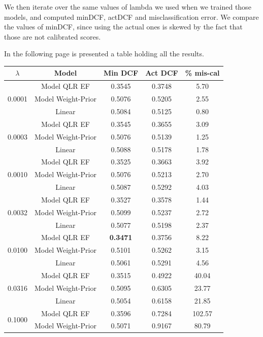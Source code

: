 \documentclass[12pt, a4paper]{article}
\begin{document}
We then iterate over the same values of lambda we used when we trained those models, and computed minDCF, actDCF and misclassification error. We compare the values of minDCF, since using the actual ones is skewed by the fact that those are not calibrated scores.

In the following page is presented a table holding all the results.
\clearpage

\begin{table}[h]
\centering
\begin{tabular}{|| c  c  c  c  c ||}
\hline
\textbf{$\lambda$} & Model & Min DCF & Act DCF & \% mis-cal \\
\hline\hline
\multirow{3}{*}{0.0001} 
 & Model QLR EF & 0.3545 & 0.3748 & 5.70 \\
 & Model Weight-Prior & 0.5076 & 0.5205 & 2.55 \\
 & Linear & 0.5084 & 0.5125 & 0.80 \\
\hline
\multirow{3}{*}{0.0003}
 & Model QLR EF & 0.3545 & 0.3655 & 3.09 \\
 & Model Weight-Prior & 0.5076 & 0.5139 & 1.25 \\
 & Linear & 0.5088 & 0.5178 & 1.78 \\
\hline
\multirow{3}{*}{0.0010}
 & Model QLR EF & 0.3525 & 0.3663 & 3.92 \\
 & Model Weight-Prior & 0.5076 & 0.5213 & 2.70 \\
 & Linear & 0.5087 & 0.5292 & 4.03 \\
\hline
\multirow{3}{*}{0.0032}
 & Model QLR EF & 0.3527 & 0.3578 & 1.44 \\
 & Model Weight-Prior & 0.5099 & 0.5237 & 2.72 \\
 & Linear & 0.5077 & 0.5198 & 2.37 \\
\hline
\multirow{3}{*}{0.0100}
 & Model QLR EF & \textbf{0.3471} & 0.3756 & 8.22 \\
 & Model Weight-Prior & 0.5101 & 0.5262 & 3.15 \\
 & Linear & 0.5061 & 0.5291 & 4.56 \\
\hline
\multirow{3}{*}{0.0316}
 & Model QLR EF & 0.3515 & 0.4922 & 40.04 \\
 & Model Weight-Prior & 0.5095 & 0.6305 & 23.77 \\
 & Linear & 0.5054 & 0.6158 & 21.85 \\
\hline
\multirow{3}{*}{0.1000}
 & Model QLR EF & 0.3596 & 0.7284 & 102.57 \\
 & Model Weight-Prior & 0.5071 & 0.9167 & 80.79 \\

\end{tabular}
\end{table}
\end{document}
